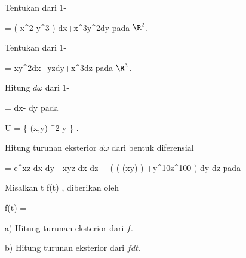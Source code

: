 \setcounter{section}{20}


{}
{

Tentukan
dari
$1$-

\mavergleichskettedisp
{\vergleichskette
{ \omega
}
{ =} { \left(  x^2-y^3  \right) dx+x^3y^2dy
}
{ } {
}
{ } {
}
{ } {
}
}
{}{}{}
pada $\R^2$.

}
{} {}

{}
{

Tentukan
dari
$1$-

\mavergleichskettedisp
{\vergleichskette
{ \omega
}
{ =} { xy^2dx+yzdy+x^3dz
}
{ } {
}
{ } {
}
{ } {
}
}
{}{}{}
pada $\R^3$.

}
{} {}

{}
{

Hitung
$d \omega$ dari
$1$-

\mavergleichskettedisp
{\vergleichskette
{ \omega
}
{ =} { {  } dx- {  } dy
}
{ } {
}
{ } {
}
{ } {
}
}
{}{}{}
pada

\mavergleichskette
{\vergleichskette
{ U
}
{ = }{ \left\{ (x,y) \in \R^2  \mid   y          \right\}
}
{  }{
}
{    }{
}
{   }{
}
}
{}{}{.}

}
{} {}

{}
{

Hitung turunan eksterior $d \omega$ dari bentuk diferensial

\mavergleichskettedisp
{\vergleichskette
{ \omega
}
{ =} {  e^{xz} dx \wedge dy - xyz dx \wedge dz + \left(  \sin ( \cos (xy) )  +y^{10}z^{100}  \right) dy \wedge dz
}
{ } {
}
{ } {
}
{ } {
}
}
{}{}{}
pada

}
{} {}

{}
{

Misalkan
 {\R} {\R
} { t } {f(t)
} {,}
diberikan oleh

\mavergleichskettedisp
{\vergleichskette
{ f(t)
}
{ =} { {  }
}
{ } {
}
{ } {
}
{ } {
}
}
{}{}{}

a) Hitung turunan eksterior dari $f$.

b) Hitung turunan eksterior dari $fdt$.

}
{} {}

